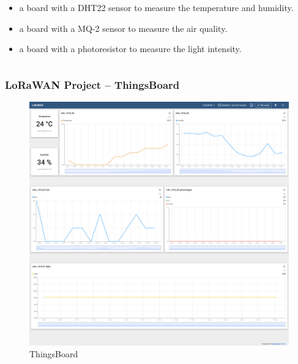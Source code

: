 \documentclass{beamer}
\begin{document}
\begin{frame}
\begin{columns}
\begin{column}{0.5\textwidth}
\begin{itemize}[<+->]
\begin{itemize}[<+->]
                          \item {}
                                a board with a DHT22 sensor to measure the temperature and humidity.
                          \item {}
                                a board with a MQ-2 sensor to measure the air quality.
                          \item {}
                                a board with a photoresistor to measure the light intensity.
                      \end{itemize}
            \end{itemize}
        \end{column}
    \end{columns}
\end{frame}

\begin{frame}
    \frametitle{LoRaWAN Project – ThingsBoard}
    \begin{figure}
        \centering
        \includegraphics[width=\textwidth]{images/thingsboard.png}
        \caption{ThingsBoard}
    \end{figure}
\end{frame}
\end{document}
